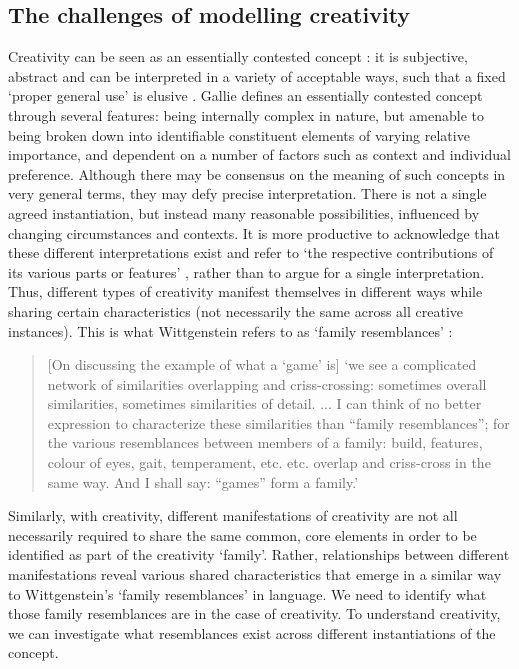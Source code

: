 \documentclass[10pt,letterpaper]{article}
\begin{document}
\subsection*{The challenges of modelling creativity} \label{cogPhil}


Creativity can be seen as an essentially contested concept \cite{gallie56}: it is subjective, abstract and can be interpreted in a variety of acceptable ways, such that a fixed `proper general use' is elusive \cite[p. 167]{gallie56}. Gallie defines an essentially contested concept through several features: being internally complex in nature, but amenable to being broken down into identifiable constituent elements of varying relative importance, and dependent on a number of factors such as context and individual preference. Although there may be consensus on the meaning of such concepts in very general terms, they may defy precise interpretation. There is not a single agreed instantiation, but instead many reasonable possibilities, influenced by changing circumstances and contexts. It is more productive to acknowledge that these different interpretations exist and refer to `the respective contributions of its various parts or features' \cite[p. 172]{gallie56}, rather than to argue for a single interpretation. Thus, different types of creativity manifest themselves in different ways while sharing certain characteristics (not necessarily the same across all creative instances). This is what Wittgenstein refers to as `family resemblances' \cite{wittgenstein58}:

\begin{quote}
[On discussing the example of what a `game' is] `we see a complicated network of similarities overlapping and criss-crossing: sometimes overall similarities, sometimes similarities of detail. ... I can think of no better expression to characterize these similarities than ``family resemblances''; for the various resemblances between members of a family: build, features, colour of eyes, gait, temperament, etc. etc. overlap and criss-cross in the same way. And I shall say: ``games'' form a family.'
\cite[Part 1, Paragraphs 66-67]{wittgenstein58}
\end{quote}

Similarly, with creativity, different manifestations of creativity are not all necessarily required to share the same common, core elements in order to be identified as part of the creativity `family'. Rather, relationships between different manifestations reveal various shared characteristics that emerge in a similar way to Wittgenstein's `family resemblances' in language. We need to identify what those family resemblances are in the case of creativity. To understand creativity, we can investigate what resemblances exist across different instantiations of the concept. 
\end{document}
